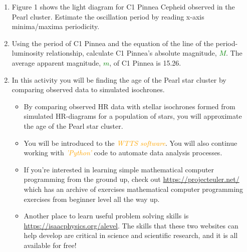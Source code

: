 \documentclass{article}
\newenvironment{white}{\color{white}}{\ignorespacesafterend}
\begin{document}
\begin{tcolorbox}
\begin{bfseries}
\begin{white}
\begin{enumerate}
                \item Figure 1 shows the light diagram for C1 Pinnea Cepheid observed in the Pearl cluster. Estimate the oscillation period by reading x-axis minima/maxima periodicity.
                
                \item Using the period of C1 Pinnea and the equation of the line of the period-luminosity relationship, calculate C1 Pinnea's absolute magnitude, \textbf{\textcolor{green}{\(M\)}}. The average apparent magnitude, \textbf{\textcolor{green}{\(m\)}}, of C1 Pinnea is 15.26.
        
            \end{enumerate}
        \end{white}
        \end{bfseries}
    \end{tcolorbox}

    
    
    
\newpage
    
    
    

    \begin{enumerate}[label=\color{purple}\theenumi]
    \setcounter{enumi}{1}
        \item In this activity you will be finding the age of the Pearl star cluster by comparing observed data to simulated isochrones.
        \begin{itemize}
            \item By comparing observed HR data with stellar isochrones formed from simulated HR-diagrams for a population of stars, you will approximate the age of the Pearl star cluster.
            \item You will be introduced to the \emph{\textcolor{orange}{WTTS software}}. You will also continue working with \emph{\textcolor{orange}{'Python'}} code to automate data analysis processes.\\
            \item If you're interested in learning simple mathematical computer programming from the ground up, check out \href{https://projecteuler.net/}{https://projecteuler.net/} which has an archive of exercises mathematical computer programming exercises from beginner level all the way up.
            \item Another place to learn useful problem solving skills is \href{https://isaacphysics.org/alevel}{https://isaacphysics.org/alevel}. The skills that these two websites can help develop are critical in science and scientific research, and it is all available for free!
        \end{itemize}
    \end{enumerate}
    
\end{document}

